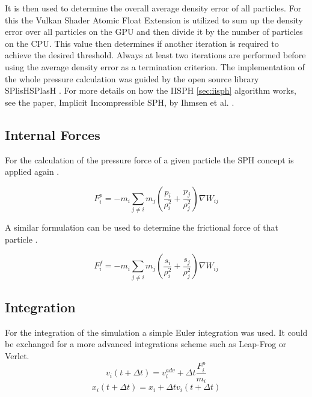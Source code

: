 \documentclass[intern]{cgMA}
\begin{document}
    It is then used to determine the overall average density error of all particles. For this the Vulkan Shader Atomic Float Extension is utilized to sum up the density error over all particles on the GPU and then divide it by the number of particles on the CPU. This value then determines if another iteration is required to achieve the desired threshold. Always at least two iterations are performed before using the average density error as a termination criterion. The implementation of the whole pressure calculation was guided by the open source library SPlisHSPlasH \cite{splishsplash}. For more details on how the IISPH \ref{sec:iisph} algorithm works, see the paper, Implicit Incompressible SPH, by Ihmsen et al. \cite{6570475}.

    \subsection{Internal Forces}
    
    For the calculation of the pressure force of a given particle the SPH concept is applied again \cite{10.2312:PE:vriphys:vriphys12:053-060}. 

    \begin{equation}
        F_i^p = -m_i \sum_{j \neq i} m_j (\frac{p_i}{\rho_i^2} + \frac{p_j}{\rho_j^2})  \nabla W_{ij}
    \end{equation}
    
    A similar formulation can be used to determine the frictional force of that particle \cite{10.2312:PE:vriphys:vriphys12:053-060}.

    \begin{equation}
        F_i^f = -m_i \sum_{j \neq i} m_j (\frac{s_i}{\rho_i^2} + \frac{s_j}{\rho_j^2})  \nabla W_{ij}
    \end{equation}

    

    \subsection{Integration}
    For the integration of the simulation a simple Euler integration was used. It could be exchanged for a more advanced integrations scheme such as Leap-Frog or Verlet.
    \begin{equation}
        v_i(t + \Delta t) = v_i^{adv} + \Delta t \frac{F_i^p}{m_i}
    \end{equation}
    \begin{equation}
        x_i(t + \Delta t) = x_i + \Delta t v_i(t + \Delta t)
    \end{equation}
\end{document}
